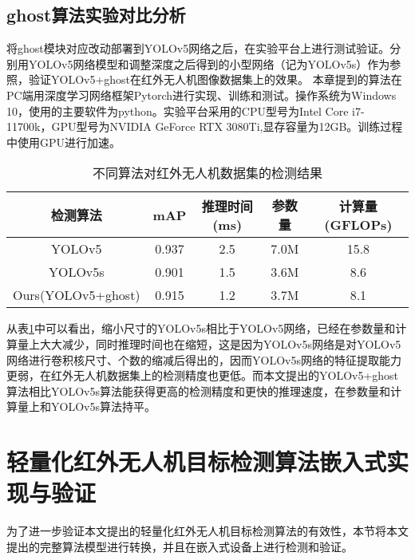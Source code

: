 \subsection{ghost算法实验对比分析}
将ghost模块对应改动部署到YOLOv5网络之后，在实验平台上进行测试验证。分别用YOLOv5网络模型和调整深度之后得到的小型网络（记为YOLOv5s）作为参照，验证YOLOv5+ghost在红外无人机图像数据集上的效果。
本章提到的算法在PC端用深度学习网络框架Pytorch进行实现、训练和测试。操作系统为Windows 10，使用的主要软件为python。实验平台采用的CPU型号为Intel Core i7-11700k，GPU型号为NVIDIA GeForce RTX 3080Ti,显存容量为12GB。训练过程中使用GPU进行加速。

\begin{table}[htbp]
    \caption{不同算法对红外无人机数据集的检测结果}
    \vspace{0.5em}\centering\wuhao
    \begin{tabular}{ccccc}
    \toprule
    检测算法 & mAP & 推理时间(ms) & 参数量 & 计算量(GFLOPs)\\
    \midrule
    YOLOv5 & 0.937 & 2.5 & 7.0M & 15.8\\
    YOLOv5s & 0.901 & 1.5 & 3.6M & 8.6\\
    Ours(YOLOv5+ghost)& 0.915 & 1.2 & 3.7M & 8.1\\
    \bottomrule
    \end{tabular}
    \label{t22}
\end{table}

从表\ref{t22}中可以看出，缩小尺寸的YOLOv5s相比于YOLOv5网络，已经在参数量和计算量上大大减少，同时推理时间也在缩短，这是因为YOLOv5s网络是对YOLOv5网络进行卷积核尺寸、个数的缩减后得出的，因而YOLOv5s网络的特征提取能力更弱，在红外无人机数据集上的检测精度也更低。而本文提出的YOLOv5+ghost算法相比YOLOv5s算法能获得更高的检测精度和更快的推理速度，在参数量和计算量上和YOLOv5s算法持平。

\section{轻量化红外无人机目标检测算法嵌入式实现与验证}
为了进一步验证本文提出的轻量化红外无人机目标检测算法的有效性，本节将本文提出的完整算法模型进行转换，并且在嵌入式设备上进行检测和验证。

